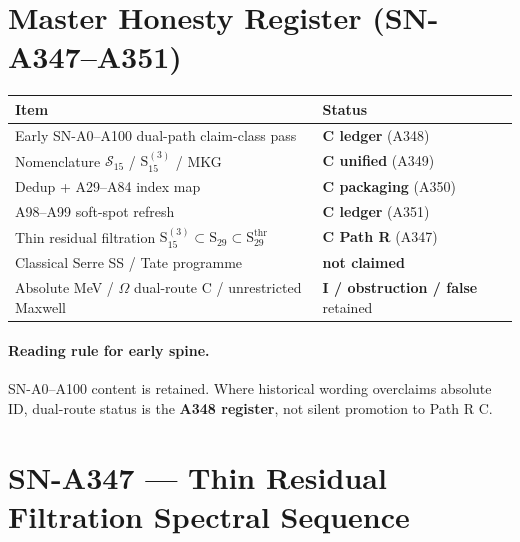 
\section*{Master Honesty Register (SN-A347--A351)}
\begin{center}
\begin{tabular}{@{}p{7.2cm}p{5.2cm}@{}}
\toprule
\textbf{Item} & \textbf{Status} \\
\midrule
Early SN-A0--A100 dual-path claim-class pass & \textbf{C ledger} (A348) \\
Nomenclature $\mathcal{S}_{15}$ / $\mathrm{S}_{15}^{(3)}$ / MKG & \textbf{C unified} (A349) \\
Dedup + A29--A84 index map & \textbf{C packaging} (A350) \\
A98--A99 soft-spot refresh & \textbf{C ledger} (A351) \\
Thin residual filtration $\mathrm{S}_{15}^{(3)}\subset\mathrm{S}_{29}\subset\mathrm{S}_{29}^{\mathrm{thr}}$ & \textbf{C Path R} (A347) \\
Classical Serre SS / Tate programme & \textbf{not claimed} \\
Absolute MeV / $\Omega$ dual-route C / unrestricted Maxwell & \textbf{I / obstruction / false} retained \\
\bottomrule
\end{tabular}
\end{center}

\paragraph{Reading rule for early spine.}
SN-A0--A100 content is retained. Where historical wording overclaims absolute ID, dual-route status is the \textbf{A348 register}, not silent promotion to Path R C.

\section{SN-A347 --- Thin Residual Filtration Spectral Sequence}
\label{sec:SN-A347}

